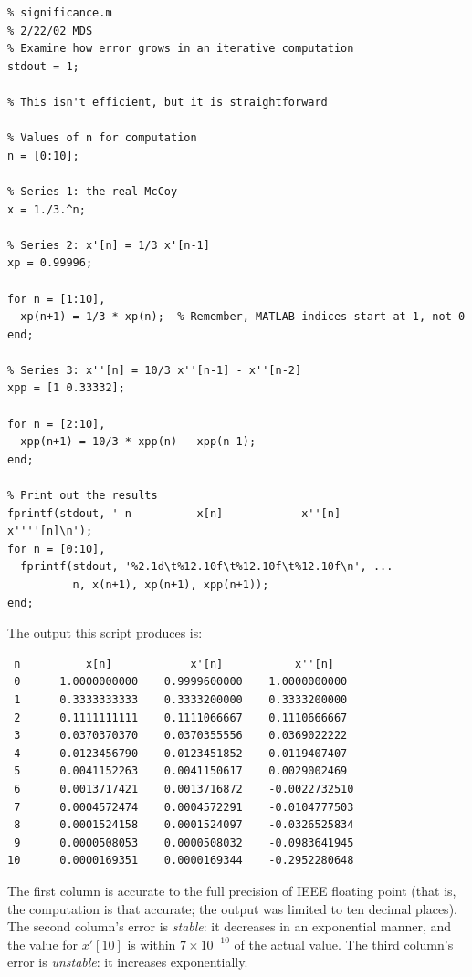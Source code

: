 \begin{small}
\begin{verbatim}
% significance.m
% 2/22/02 MDS
% Examine how error grows in an iterative computation
stdout = 1;

% This isn't efficient, but it is straightforward

% Values of n for computation
n = [0:10];

% Series 1: the real McCoy
x = 1./3.^n;

% Series 2: x'[n] = 1/3 x'[n-1]
xp = 0.99996;

for n = [1:10],
  xp(n+1) = 1/3 * xp(n);  % Remember, MATLAB indices start at 1, not 0
end;

% Series 3: x''[n] = 10/3 x''[n-1] - x''[n-2]
xpp = [1 0.33332];

for n = [2:10],
  xpp(n+1) = 10/3 * xpp(n) - xpp(n-1);
end;

% Print out the results
fprintf(stdout, ' n          x[n]            x''[n]           x''''[n]\n');
for n = [0:10],
  fprintf(stdout, '%2.1d\t%12.10f\t%12.10f\t%12.10f\n', ...
          n, x(n+1), xp(n+1), xpp(n+1));
end;
\end{verbatim}
\end{small}

The output this script produces is:
\begin{verbatim}
 n          x[n]            x'[n]           x''[n]
 0      1.0000000000    0.9999600000    1.0000000000
 1      0.3333333333    0.3333200000    0.3333200000
 2      0.1111111111    0.1111066667    0.1110666667
 3      0.0370370370    0.0370355556    0.0369022222
 4      0.0123456790    0.0123451852    0.0119407407
 5      0.0041152263    0.0041150617    0.0029002469
 6      0.0013717421    0.0013716872    -0.0022732510
 7      0.0004572474    0.0004572291    -0.0104777503
 8      0.0001524158    0.0001524097    -0.0326525834
 9      0.0000508053    0.0000508032    -0.0983641945
10      0.0000169351    0.0000169344    -0.2952280648
\end{verbatim}

The first column is accurate to the full precision of IEEE floating
point (that is, the computation is that accurate; the output was
limited to ten decimal places).  The second column's error is
\emph{stable}: it decreases in an exponential manner, and the value
for $x'[10]$ is within $7 \times 10^{-10}$ of the actual value. The
third column's error is \emph{unstable}: it increases exponentially.

